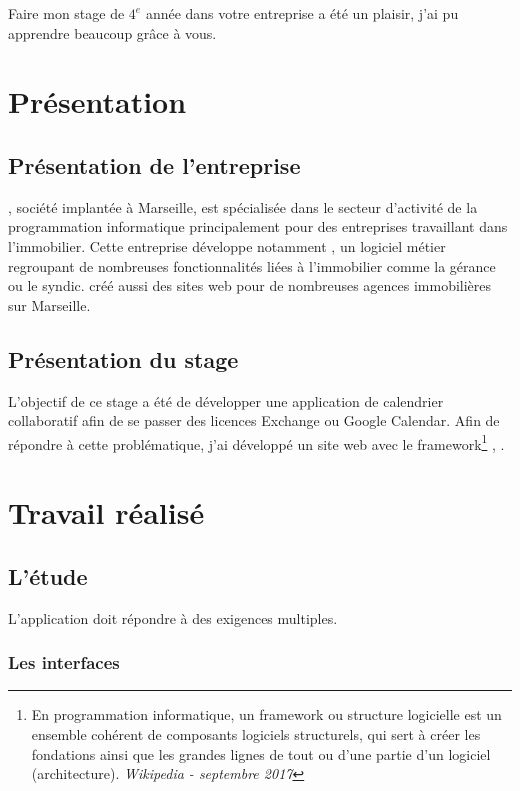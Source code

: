 \documentclass[a4paper, 11pt]{report}
\begin{document}
Faire mon stage de $4^e$ année dans votre entreprise a été un plaisir, j'ai pu apprendre beaucoup grâce à vous.

\tableofcontents

\chapter{Présentation}
\section{Présentation de l'entreprise}
\lgk\cite{logilink}, société implantée à Marseille, est spécialisée dans le secteur d'activité de la programmation informatique principalement pour des entreprises travaillant dans l'immobilier. Cette entreprise développe notamment \ulti, un logiciel métier regroupant de nombreuses fonctionnalités liées à l’immobilier comme la gérance ou le syndic. \lgk créé aussi des sites web pour de nombreuses agences immobilières sur Marseille.

\section{Présentation du stage}
L'objectif de ce stage a été de développer une application de calendrier collaboratif afin de se passer des licences Exchange\cite{ex} ou Google Calendar\cite{gcal}. Afin de répondre à cette problématique, j'ai développé un site web avec le framework\footnote{En programmation informatique, un framework ou structure logicielle est un ensemble cohérent de composants logiciels structurels, qui sert à créer les fondations ainsi que les grandes lignes de tout ou d'une partie d'un logiciel (architecture). \textit{Wikipedia - septembre 2017}} \php\cite{php}, \symfony\cite{symfony}.

\chapter{Travail réalisé}
\section{L'étude}
L'application doit répondre à des exigences multiples.
    \subsection{Les interfaces}
\end{document}
